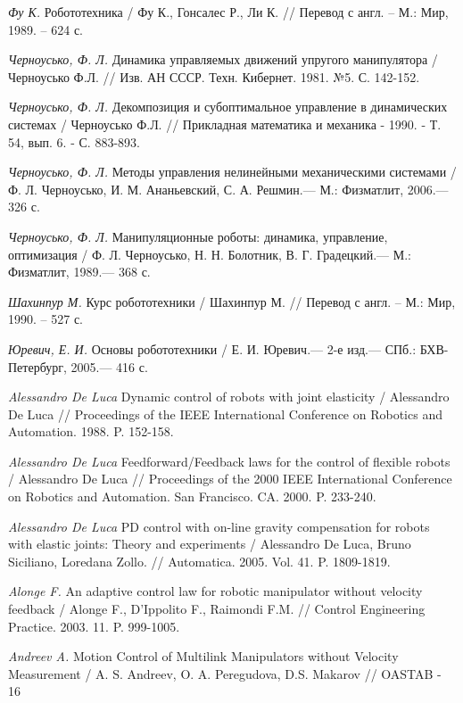 \begin{thebibliography}{10}
	{\it Фу К.} Робототехника / Фу К., Гонсалес Р., Ли К. // Перевод с англ. – М.: Мир, 1989. – 624 с.
	
	{\it Черноусько, Ф. Л.} Динамика управляемых движений упругого манипулятора / Черноусько Ф.Л. // Изв. АН СССР. Техн. Кибернет. 1981. №5. С. 		142-152.
	
	{\it Черноусько, Ф. Л.} Декомпозиция и субоптимальное управление в динамических системах / Черноусько Ф.Л. // Прикладная математика и механика - 1990. - Т. 54, вып. 6. - С. 883-893.

	{\it Черноусько, Ф. Л.} Методы управления нелинейными механическими системами /
	Ф. Л. Черноусько, И. М. Ананьевский, С. А. Решмин.— М.: Физматлит, 2006.— 326 с.
	
	{\it Черноусько, Ф. Л.} Манипуляционные роботы: динамика, управление, оптимизация /
	Ф. Л. Черноусько, Н. Н. Болотник, В. Г. Градецкий.— М.: Физматлит, 1989.— 368 с.

	
	{\it Шахинпур М.} Курс робототехники / Шахинпур М. // Перевод с англ. – М.: Мир, 1990. – 527 с. 
	
	{\it Юревич, Е. И.} Основы робототехники / Е. И. Юревич.— 2-е изд.— СПб.:
	БХВ-Петербург, 2005.— 416 с.

	{\it Alessandro De Luca} Dynamic control of robots with joint elasticity / Alessandro De Luca // Proceedings of the IEEE
	International Conference on Robotics and Automation. 1988. P. 152-158.

	{\it Alessandro De Luca} Feedforward/Feedback laws for the control of flexible robots / Alessandro De Luca //
	Proceedings of the 2000 IEEE International Conference on Robotics and Automation. San Francisco. CA.
	2000. P. 233-240.
	
	{\it Alessandro De Luca} PD control with on-line gravity compensation for robots with elastic joints: Theory and experiments / Alessandro De 		Luca, Bruno Siciliano, Loredana Zollo. // Automatica. 2005. Vol. 41. P. 1809-1819.
	
	{\it Alonge F.} An adaptive control law for robotic manipulator without velocity feedback / Alonge F., D’Ippolito F., Raimondi F.M. // Control 		Engineering Practice. 2003. 11. P. 999-1005.

	{\it Andreev A.} Motion Control of Multilink Manipulators without Velocity Measurement / A. S. Andreev, O. A. Peregudova, D.S. Makarov // OASTAB 	- 16
	

\end{thebibliography}
